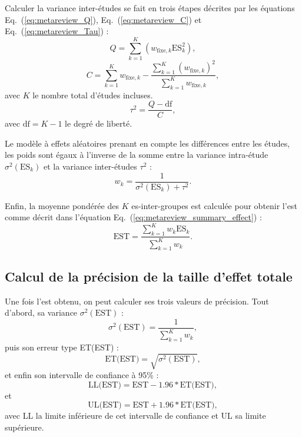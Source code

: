 Calculer la variance inter-études se fait en trois étapes décrites par les équations Eq.~(\ref{eq:metareview_Q}), Eq.~(\ref{eq:metareview_C}) 
et Eq.~(\ref{eq:metareview_Tau}) \citep{Borenstein2009} :
\begin{equation}
\label{eq:metareview_Q}
Q = \sum_{k=1}^{K} (w_{\text{fixe},k} \text{ES}_k^2),
\end{equation}
\begin{equation}
\label{eq:metareview_C}
C = \sum_{k=1}^{K} w_{\text{fixe},k} - \frac{ \sum_{k=1}^{K} (w_{\text{fixe},k})^2 } { \sum_{k=1}^{K} w_{\text{fixe},k} },
\end{equation}
avec $K$ le nombre total d'études incluses.
\begin{equation}
\label{eq:metareview_Tau}
\tau^2 = \frac{Q - \text{df}}{C},
\end{equation}
avec $\text{df} = K - 1$ le degré de liberté.

Le modèle à effets aléatoires prenant en compte les différences entre les études, les poids sont égaux à l'inverse de la somme entre la variance intra-étude
$\sigma^2(\text{ES}_k)$ et la variance inter-études $\tau^2$ \citep{Borenstein2009} :
\begin{equation}
\label{eq:metareview_weight_study}
w_k = \frac{1}{\sigma^2(\text{ES}_k) + \tau^2}.
\end{equation} 

Enfin, la moyenne pondérée des $K$ \gls{es}-inter-groupes est calculée pour obtenir l'\gls{est} comme décrit dans l'équation
Eq.~(\ref{eq:metareview_summary_effect}) \citep{Borenstein2009}:
\begin{equation}
\label{eq:metareview_summary_effect}
\text{EST} = \frac{\sum_{k=1}^{K} w_k \text{ES}_k} {\sum_{k=1}^{K} w_k}.
\end{equation} 

\subsection{Calcul de la précision de la taille d'effet totale}

Une fois l'\gls{est} obtenu, on peut calculer ses trois valeurs de précision. Tout d'abord, sa variance $\sigma^2(\text{EST})$ :  
\begin{equation}
\label{eq:metareview_variance_summary_effect}
\sigma^2(\text{EST}) = \frac{1} {\sum_{k=1}^{K} w_k},
\end{equation} 
puis son erreur type ET(EST) :
\begin{equation}
\label{eq:metareview_standard_error_effect}
\text{ET(EST)} = \sqrt{\sigma^2(\text{EST})},
\end{equation} 
et enfin son intervalle de confiance à 95\% : 
\begin{equation}
\label{eq:metareview_confidence_interval_summary_effect_lower_bound}
\text{LL(EST)} = \text{EST} - 1.96 * \text{ET(EST)},
\end{equation}
et 
\begin{equation}
\label{eq:metareview_confidence_interval_summary_effect_upper_bound}
\text{UL(EST)} = \text{EST} + 1.96 * \text{ET(EST)},
\end{equation}
avec LL la limite inférieure de cet intervalle de confiance et UL sa limite supérieure.

